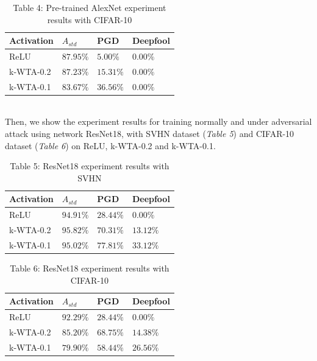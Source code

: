 \documentclass[a4paper]{article}
\begin{document}
	\begin{table}[!htbp]
		\begin{tabular}{|p{}|p{}|p{}|p{}|}
			\hline
			Activation	& $A_{std}$	&	PGD	&	Deepfool	\\
			\hline
			ReLU		&$87.95\%$&$5.00\%$&$0.00\%$	\\
			\hline
			k-WTA-0.2	&$87.23\%$&$15.31\%$&$0.00\%$	\\
			\hline
			k-WTA-0.1	&$83.67\%$&$36.56\%$&$0.00\%$	\\
			\hline
		\end{tabular}
		\caption{Table 4: Pre-trained AlexNet experiment results with CIFAR-10}\label{pre-alexnetCIFAR10}
	\end{table}\\
	Then, we show the experiment results for training normally and under adversarial attack using network ResNet18, with SVHN dataset (\textit{Table 5}) and CIFAR-10 dataset (\textit{Table 6}) on ReLU, k-WTA-0.2 and k-WTA-0.1.
	\begin{table}[!htbp]
		\begin{tabular}{|p{}|p{}|p{}|p{}|}
			\hline
			Activation	& $A_{std}$	&	PGD	&	Deepfool	\\
			\hline
			ReLU		&$94.91\%$&$28.44\%$&$0.00\%$	\\
			\hline
			k-WTA-0.2	&$95.82\%$&$70.31\%$&$13.12\%$	\\
			\hline
			k-WTA-0.1	&$95.02\%$&$77.81\%$&$33.12\%$	\\
			\hline
		\end{tabular}
		\caption{Table 5: ResNet18 experiment results with SVHN}\label{resnetSVHN}
	\end{table}
	\begin{table}[!htbp]
		\begin{tabular}{|p{}|p{}|p{}|p{}|}
			\hline
			Activation	& $A_{std}$	&	PGD	&	Deepfool	\\
			\hline
			ReLU		&$92.29\%$&$28.44\%$&$0.00\%$	\\
			\hline
			k-WTA-0.2	&$85.20\%$&$68.75\%$&$14.38\%$	\\
			\hline
			k-WTA-0.1	&$79.90\%$&$58.44\%$&$26.56\%$	\\
			\hline
		\end{tabular}
		\caption{Table 6: ResNet18 experiment results with CIFAR-10}\label{resnetCIFAR10}
	\end{table}\\
\end{document}
